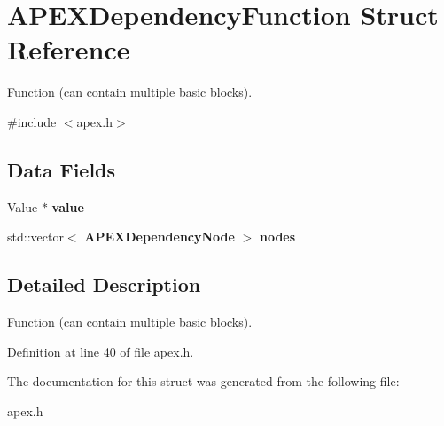 \section{A\+P\+E\+X\+Dependency\+Function Struct Reference}
\label{structAPEXDependencyFunction}


Function (can contain multiple basic blocks).  




{\ttfamily \#include $<$apex.\+h$>$}

\subsection*{Data Fields}
\begin{DoxyCompactItemize}
\item 
\mbox{\label{structAPEXDependencyFunction_ad40a9b218b3412fbef6d251c096348da}} 
Value $\ast$ {\bfseries value}
\item 
\mbox{\label{structAPEXDependencyFunction_a88b9c8546d91814c01326726b91b882a}} 
std\+::vector$<$ \textbf{ A\+P\+E\+X\+Dependency\+Node} $>$ {\bfseries nodes}
\end{DoxyCompactItemize}


\subsection{Detailed Description}
Function (can contain multiple basic blocks). 

Definition at line 40 of file apex.\+h.



The documentation for this struct was generated from the following file\+:\begin{DoxyCompactItemize}
\item 
apex.\+h\end{DoxyCompactItemize}

